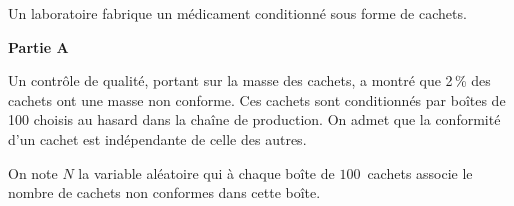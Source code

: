 
%

\smallskip

Un laboratoire fabrique un médicament conditionné sous forme de cachets.

\begin{center}
\textbf{Partie A}
\end{center}

Un contrôle de qualité, portant sur la masse des cachets, a montré que 2\,\% des cachets ont une masse non conforme. Ces cachets sont conditionnés par boîtes de 100 choisis au hasard dans la chaîne de production. On admet que la conformité d'un cachet est indépendante de celle des autres.


On note $N$ la variable aléatoire qui à chaque boîte de $100$~cachets associe le nombre de cachets non conformes dans cette boîte.

